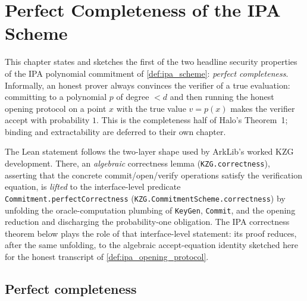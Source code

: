 \chapter{Perfect Completeness of the IPA Scheme}

This chapter states and sketches the first of the two headline security
properties of the IPA polynomial commitment of \cref{def:ipa_scheme}:
\emph{perfect completeness}. Informally, an honest prover always convinces the
verifier of a true evaluation: committing to a polynomial \(p\) of degree
\(< d\) and then running the honest opening protocol on a point \(x\) with the
true value \(v = p(x)\) makes the verifier accept with probability \(1\). This
is the completeness half of Halo's Theorem~1; binding and extractability are
deferred to their own chapter.

The Lean statement follows the two-layer shape used by ArkLib's worked KZG
development. There, an \emph{algebraic} correctness lemma
(\texttt{KZG.correctness}), asserting that the concrete commit/open/verify
operations satisfy the verification equation, is \emph{lifted} to the
interface-level predicate \texttt{Commitment.perfectCorrectness}
(\texttt{KZG.CommitmentScheme.correctness}) by unfolding the oracle-computation
plumbing of \texttt{KeyGen}, \texttt{Commit}, and the opening reduction and
discharging the probability-one obligation. The IPA correctness theorem below
plays the role of that interface-level statement: its proof reduces, after the
same unfolding, to the algebraic accept-equation identity sketched here for the
honest transcript of \cref{def:ipa_opening_protocol}.

\section{Perfect completeness}

